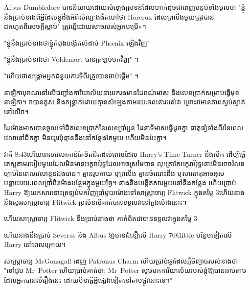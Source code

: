 Albus Dumbledore បាននិយាយដោយសំឡេងស្រទន់ដែលហាក់ដូចជាពេញបន្ទប់ទាំងមូលថា "ខ្ញុំនឹងប្រាប់នាងពីអ្វីដែលខ្ញុំដឹងអំពីសិល្បៈងងឹតហៅថា Horcrux ដែលព្រលឹងមួយត្រូវបានដកហូតពីសេចក្តីស្លាប់" ត្រូវ​ធ្វើ​ដោយ​សាច់​របស់​អ្នក​បម្រើ»។

"ខ្ញុំនឹងប្រាប់នាងថាខ្ញុំកំពុងបង្កើតលំដាប់ Phœnix ឡើងវិញ"

"ខ្ញុំនឹងប្រាប់នាងថា Voldemort បានត្រឡប់មកវិញ" ។

"ហើយថាសង្រ្គាមអ្នកជំនួយការទីពីរត្រូវបានចាប់ផ្តើម" ។


នាឡិកា​បុរាណ​នៅ​លើ​ជញ្ជាំង​ការិយាល័យ​នាយក​រង​មាន​ដៃ​ពណ៌​មាស និង​លេខ​ប្រាក់​សម្រាប់​ធ្វើ​មុខ​នាឡិកា។ វាបានគូស និងកន្ត្រាក់ដោយគ្មានសំឡេងតាមរយៈចលនារបស់វា ព្រោះវាមានភាពស្ងប់ស្ងាត់នៅលើវា។

ដៃម៉ោងមាសបានចូលទៅជិតលេខប្រាក់នៃលេខប្រាំបួន ដៃនាទីមាសធ្វើដូចគ្នា ធាតុផ្សំទាំងពីរនៃពេលវេលានៅជិតគ្នា មិនយូរប៉ុន្មាននឹងនៅកន្លែងតែមួយ ហើយមិនប៉ះគ្នា។

វាគឺ 8:43\pm ហើយពេលវេលាកាន់តែខិតជិតដល់ពេលដែល Harry's Time-Turner នឹងបើក ដើម្បីធ្វើតេស្តតាមរបៀបមួយដែលមិនមានអក្ខរាវិរុទ្ធដែលអាចស្រមៃបាន លុះត្រាតែអក្ខរាវិរុទ្ធនោះមិនអាចរំលងច្បាប់នៃពេលវេលាខ្លួនឯងបាន។ គ្មានរូបកាយ ឬព្រលឹង គ្មានចំណេះដឹង ឬសារធាតុអាចអូសបន្លាយរយៈពេលប្រាំពីរម៉ោងបន្ថែមក្នុងមួយថ្ងៃ។ នាងនឹងបង្កើតសារមួយនៅនឹងកន្លែង ហើយប្រាប់ Harry ឱ្យយកសារនោះត្រឡប់មកវិញប្រាំមួយម៉ោងទៅសាស្រ្តាចារ្យ Flitwick ក្នុងតម្លៃ 3\pm ហើយនាងនឹងសួរសាស្រ្តាចារ្យ Flitwick ប្រសិនបើគាត់បានទទួលវានៅក្នុងម៉ោងនោះ។

ហើយសាស្រ្តាចារ្យ Flitwick នឹងប្រាប់នាងថា គាត់ពិតជាបានទទួលវាក្នុងតម្លៃ 3\pm

ហើយនាងនឹងប្រាប់ Severus និង Albus ឱ្យមានជំនឿលើ Harry 70€{little} បន្ថែមទៀតលើ Harry នៅពេលក្រោយ។

សាស្ត្រាចារ្យ McGonagall ដេញ Patronus Charm ហើយប្រាប់ឆ្មាដែលភ្លឺចិញ្ចាចរបស់នាងថា "ទៅជួប Mr~Potter ហើយប្រាប់គាត់ថា: Mr~Potter សូមមកការិយាល័យរបស់ខ្ញុំឱ្យបានឆាប់តាមដែលអ្នកបានលឺរឿងនេះ ដោយមិនធ្វើអ្វីផ្សេងទៀតនៅតាមផ្លូវនោះទេ។"

